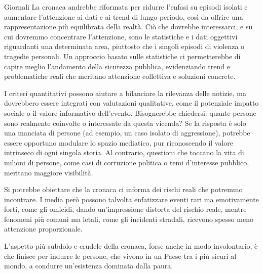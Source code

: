\documentclass[12pt]{book} %
\begin{document}
\begin{mdframed}[linewidth=1pt]
Giornali
La cronaca andrebbe riformata per ridurre l’enfasi su episodi isolati e aumentare l’attenzione ai dati e ai trend di lungo periodo, così da offrire una rappresentazione più equilibrata della realtà. Ciò che dovrebbe interessarci, e su cui dovremmo concentrare l'attenzione, sono le statistiche e i dati oggettivi riguardanti una determinata area, piuttosto che i singoli episodi di violenza o tragedie personali. Un approccio basato sulle statistiche ci permetterebbe di capire meglio l'andamento della sicurezza pubblica, evidenziando trend e problematiche reali che meritano attenzione collettiva e soluzioni concrete.

I criteri quantitativi possono aiutare a bilanciare la rilevanza delle notizie, ma dovrebbero essere integrati con valutazioni qualitative, come il potenziale impatto sociale o il valore informativo dell’evento. Bisognerebbe chiedersi: quante persone sono realmente coinvolte o interessate da questa vicenda? Se la risposta è solo una manciata di persone (ad esempio, un caso isolato di aggressione), potrebbe essere opportuno modulare lo spazio mediatico, pur riconoscendo il valore intrinseco di ogni singola storia. Al contrario, questioni che toccano la vita di milioni di persone, come casi di corruzione politica o temi d'interesse pubblico, meritano maggiore visibilità.

Si potrebbe obiettare che la cronaca ci informa dei rischi reali che potremmo incontrare. I media però possono talvolta enfatizzare eventi rari ma emotivamente forti, come gli omicidi, dando un’impressione distorta del rischio reale, mentre fenomeni più comuni ma letali, come gli incidenti stradali, ricevono spesso meno attenzione proporzionale.

L’aspetto più subdolo e crudele della cronaca, forse anche in modo involontario, è che finisce per indurre le persone, che vivono in un Paese tra i più sicuri al mondo, a condurre un’esistenza dominata dalla paura.
\end{mdframed}
\end{document}
